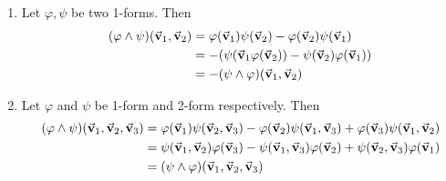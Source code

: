 \documentclass{homework}
\begin{document}
\begin{problem}{13}
\begin{enumerate}
\item Let $\varphi, \psi$ be two 1-forms. Then
\begin{align*}
(\varphi \land \psi)(\vec{\mathbf{v}}_1,\vec{\mathbf{v}}_2) &=
\varphi(\vec{\mathbf{v}}_1)\psi(\vec{\mathbf{v}}_2)-
\varphi(\vec{\mathbf{v}}_2)\psi(\vec{\mathbf{v}}_1) \\ &=
-(\psi(\vec{\mathbf{v}}_1\varphi(\vec{\mathbf{v}}_2))
-\psi(\vec{\mathbf{v}}_2)\varphi(\vec{\mathbf{v}}_1)) \\ &=
-(\psi \land \varphi)(\vec{\mathbf{v}}_1,\vec{\mathbf{v}}_2)
\end{align*}

\item Let $\varphi$ and $\psi$ be 1-form and 2-form respectively. Then
\begin{align*}
(\varphi \land \psi)(\vec{\mathbf{v}}_1,\vec{\mathbf{v}}_2,\vec{\mathbf{v}}_3) &=
\varphi(\vec{\mathbf{v}}_1)\psi(\vec{\mathbf{v}}_2,\vec{\mathbf{v}}_3)-
\varphi(\vec{\mathbf{v}}_2)\psi(\vec{\mathbf{v}}_1,\vec{\mathbf{v}}_3)+
\varphi(\vec{\mathbf{v}}_3)\psi(\vec{\mathbf{v}}_1,\vec{\mathbf{v}}_2)\\ &=
\psi(\vec{\mathbf{v}}_1,\vec{\mathbf{v}}_2)\varphi(\vec{\mathbf{v}}_3)-
\psi(\vec{\mathbf{v}}_1,\vec{\mathbf{v}}_3)\varphi(\vec{\mathbf{v}}_2)+
\psi(\vec{\mathbf{v}}_2,\vec{\mathbf{v}}_3)\varphi(\vec{\mathbf{v}}_1)\\ &=
(\psi \land \varphi)(\vec{\mathbf{v}}_1,\vec{\mathbf{v}}_2,\vec{\mathbf{v}}_3)
\end{align*}
\end{enumerate}
\end{problem}
\end{document}
